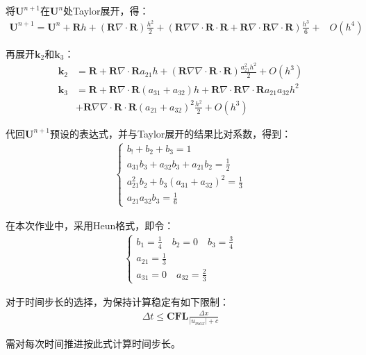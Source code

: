 \documentclass[12pt, a4paper]{article}
\begin{document}
将$\mathbf{U}^{n+1}$在$\mathbf{U}^{n}$处Taylor展开，得：
\begin{align}
    \mathbf{U}^{n+1} = \mathbf{U}^n + \mathbf{R}h + (\mathbf{R}\nabla\cdot\mathbf{R})\frac{h^2}{2}+(\mathbf{R}\nabla\nabla\cdot\mathbf{R}\cdot\mathbf{R}+\mathbf{R}\nabla\cdot\mathbf{R}\nabla\cdot\mathbf{R})\frac{h^3}{6} + &O(h^4)
\end{align}

再展开$\mathbf{k}_2$和$\mathbf{k}_3$：
\begin{align}
    \mathbf{k}_2 &=  \mathbf{R} + \mathbf{R}\nabla\cdot\mathbf{R}a_{21}h + (\mathbf{R}\nabla\nabla\cdot\mathbf{R}\cdot\mathbf{R})\frac{a_{21}^2h^2}{2}+O(h^3)\\
    \mathbf{k}_3 &= \mathbf{R} + \mathbf{R}\nabla\cdot\mathbf{R}(a_{31}+a_{32})h + \mathbf{R}\nabla\cdot\mathbf{R}\nabla\cdot\mathbf{R}a_{21}a_{32}h^2\\
    &+\mathbf{R}\nabla\nabla\cdot\mathbf{R}\cdot\mathbf{R}(a_{21}+a_{32})^2\frac{h^2}{2}+O(h^3)
\end{align}

代回$\mathbf{U}^{n+1}$预设的表达式，并与Taylor展开的结果比对系数，得到：
\begin{align}
    \begin{cases}
        b_!+b_2+b_3=1\\
        a_{31}b_3+a_32b_3+a_21b_2=\frac{1}{2}\\
        a_{21}^2b_{2}+b_{3}(a_{31}+a_{32})^2 = \frac{1}{3}\\
        a_{21}a_{32}b_3=\frac{1}{6}
    \end{cases}
\end{align}

在本次作业中，采用Heun格式，即令：
\begin{align}
    \begin{cases}
        b_1=\frac{1}{4}\quad b_2=0 \quad b_3=\frac{3}{4}\\
        a_{21} = \frac{1}{3}\\
        a_{31}=0\quad a_{32} = \frac{2}{3}
    \end{cases}
\end{align}

对于时间步长的选择，为保持计算稳定有如下限制：
\begin{align}
    \Delta t \leqslant\mathbf{CFL}\frac{\Delta x}{|u_{max}|+c}
\end{align}

需对每次时间推进按此式计算时间步长。
\end{document}
